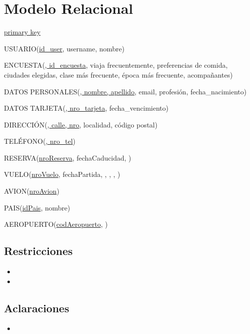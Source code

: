 \section{Modelo Relacional}

\begin{framed} \centering
  \underline{primary key} \hspace*{3cm}
\end{framed}

\vspace*{0.5cm}
\noindent
USUARIO(\underline{id\_user}, username, nombre)


\vspace*{0.5cm}
\noindent
ENCUESTA(\underline{, id\_encuesta}, viaja frecuentemente, 
					preferencias de comida, ciudades elegidas, clase más frecuente,
					época más frecuente, acompañantes)

\vspace*{0.5cm}
\noindent
DATOS PERSONALES(\underline{, nombre, apellido}, email,
					profesión, fecha\_nacimiento)

\vspace*{0.5cm}
\noindent
DATOS TARJETA(\underline{, nro\_tarjeta}, fecha\_vencimiento)


\vspace*{0.5cm}
\noindent
DIRECCIÓN(\underline{, calle, nro}, localidad,
					código postal)

\vspace*{0.5cm}
\noindent
TELÉFONO(\underline{, nro\_tel})




\vspace*{0.5cm}
\noindent
RESERVA(\underline{nroReserva}, fechaCaducidad, )

\vspace*{0.5cm}
\noindent
VUELO(\underline{nroVuelo}, fechaPartida, , , , )

\vspace*{0.5cm}
\noindent
AVION(\underline{nroAvion})

\vspace*{0.5cm}
\noindent
PAIS(\underline{idPais}, nombre)

\vspace*{0.5cm}
\noindent
AEROPUERTO(\underline{codAeropuerto}, )

\subsection{Restricciones}
\begin{itemize}
  \item
  
  \item
\end{itemize}

\subsection{Aclaraciones}
\begin{itemize}
  \item

\end{itemize}
